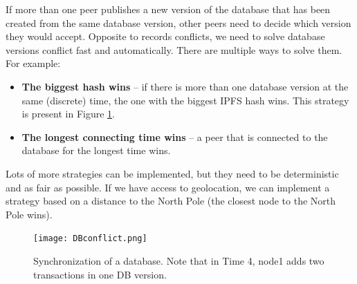 If more than one peer publishes a new version of the database that has been created from the same database version, other peers need to decide which version they would accept. Opposite to records conflicts, we need to solve database versions conflict fast and automatically. There are multiple ways to solve them. For example: 
\begin{itemize}
    \item \textbf{The biggest hash wins} -- if there is more than one database version at the same (discrete) time, the one with the biggest IPFS hash wins. This strategy is present in Figure \ref{databaseConflict}. 
    \item \textbf{The longest connecting time wins} -- a peer that is connected to the database for the longest time wins.
\end{itemize}
Lots of more strategies can be implemented, but they need to be deterministic and as fair as possible. If we have access to geolocation, we can implement a strategy based on a distance to the North Pole (the closest node to the North Pole wins). \cite{lamport2019time}

\begin{figure}[h]
    \centering
    \texttt{[image: DBconflict.png]}
    \caption{Synchronization of a database. Note that in Time 4, node1 adds two transactions in one DB version.}
    \label{databaseConflict}
\end{figure}

